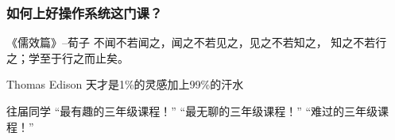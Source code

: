 %    
%

    
\begin{frame}
    \frametitle{如何上好操作系统这门课？}
\begin{block}{《儒效篇》--荀子}
不闻不若闻之，闻之不若见之，见之不若知之，
知之不若行之；学至于行之而止矣。 
\end{block} \pause     
\begin{block}{Thomas Edison }
   天才是1\%的灵感加上99\%的汗水 
\end{block} \pause
\begin{block}{往届同学}
   “最有趣的三年级课程！”  “最无聊的三年级课程！” “难过的三年级课程！”
\end{block}    

\end{frame}



